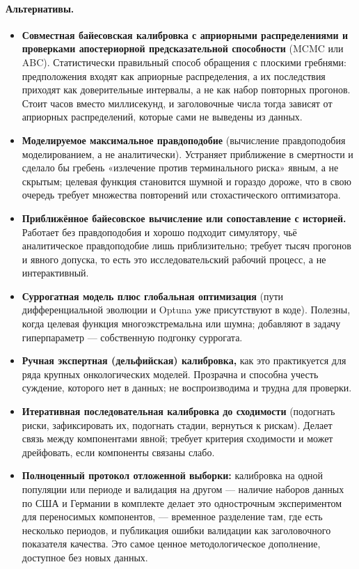 \documentclass[12pt,a4paper]{article}
\newcommand{\alt}[1]{\paragraph{Альтернативы.} #1}
\begin{document}
\alt{\begin{itemize}[nosep]
  \item \textbf{Совместная байесовская калибровка с априорными распределениями и проверками апостериорной
        предсказательной способности} (MCMC или ABC). Статистически правильный способ обращения с плоскими
        гребнями: предположения входят как априорные распределения, а их последствия приходят как
        доверительные интервалы, а не как набор повторных прогонов. Стоит часов вместо миллисекунд, и
        заголовочные числа тогда зависят от априорных распределений, которые сами не выведены из данных.
  \item \textbf{Моделируемое максимальное правдоподобие} (вычисление правдоподобия моделированием, а не
        аналитически). Устраняет приближение в смертности и сделало бы гребень «излечение против
        терминального риска» явным, а не скрытым; целевая функция становится шумной и гораздо дороже, что в
        свою очередь требует множества повторений или стохастического оптимизатора.
  \item \textbf{Приближённое байесовское вычисление или сопоставление с историей.} Работает без
        правдоподобия и хорошо подходит симулятору, чьё аналитическое правдоподобие лишь приблизительно;
        требует тысяч прогонов и явного допуска, то есть это исследовательский рабочий процесс, а не
        интерактивный.
  \item \textbf{Суррогатная модель плюс глобальная оптимизация} (пути дифференциальной эволюции и Optuna уже
        присутствуют в коде). Полезны, когда целевая функция многоэкстремальна или шумна; добавляют в задачу
        гиперпараметр --- собственную подгонку суррогата.
  \item \textbf{Ручная экспертная (дельфийская) калибровка,} как это практикуется для ряда крупных
        онкологических моделей. Прозрачна и способна учесть суждение, которого нет в данных; не
        воспроизводима и трудна для проверки.
  \item \textbf{Итеративная последовательная калибровка до сходимости} (подогнать риски, зафиксировать их,
        подогнать стадии, вернуться к рискам). Делает связь между компонентами явной; требует критерия
        сходимости и может дрейфовать, если компоненты связаны слабо.
  \item \textbf{Полноценный протокол отложенной выборки:} калибровка на одной популяции или периоде и
        валидация на другом --- наличие наборов данных по США и Германии в комплекте делает это
        однострочным экспериментом для переносимых компонентов, --- временное разделение там, где есть
        несколько периодов, и публикация ошибки валидации как заголовочного показателя качества. Это самое
        ценное методологическое дополнение, доступное без новых данных.
\end{itemize}}
\end{document}
